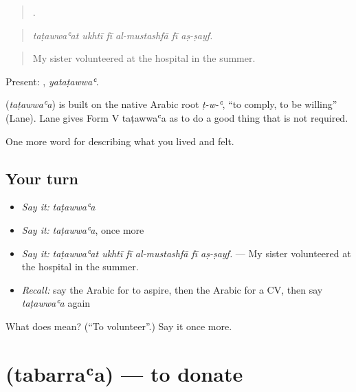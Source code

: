 \begin{quote}
     .
\end{quote}

\begin{quote}
\emph{taṭawwaʿat ukhtī fī al-mustashfā fī aṣ-ṣayf.}
\end{quote}

\begin{quote}
My sister volunteered at the hospital in the summer.
\end{quote}

Present: , \emph{yataṭawwaʿ}.

\begin{cousinweb}
\textbf{} (\emph{taṭawwaʿa}) is built on the native Arabic root \emph{ṭ-w-ʿ}, \textquotedblleft{}to comply, to be willing\textquotedblright{} (Lane). Lane gives Form V taṭawwaʿa as to do a good thing that is not required.
\end{cousinweb}

\begin{grammarlens}[title={What you've built}]
One more word for describing what you lived and felt.
\end{grammarlens}

\subsection*{Your turn}
\begin{itemize}
\raggedright
  \item \emph{Say it:} \emph{taṭawwaʿa}
  \item \emph{Say it:} \emph{taṭawwaʿa}, once more
  \item \emph{Say it:} \emph{taṭawwaʿat ukhtī fī al-mustashfā fī aṣ-ṣayf.} — My sister volunteered at the hospital in the summer.
  \item \emph{Recall:} say the Arabic for to aspire, then the Arabic for a CV, then say \emph{taṭawwaʿa} again
\end{itemize}

\begin{tcolorbox}[breakable,colback=teal!4,colframe=teal!35!black,title={Before you move on}]
What does  mean? (\textquotedblleft{}To volunteer\textquotedblright{}.) Say it once more.
\end{tcolorbox}
\section[\texorpdfstring{\ar{تبرع} (tabarraʿa)}{تبرع (tabarraʿa)}]{ (tabarraʿa) — to donate}

